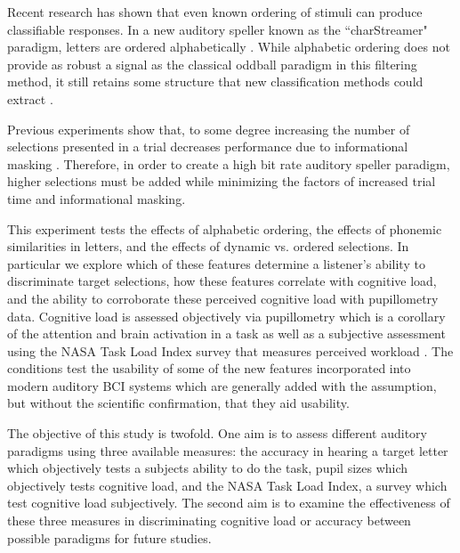 \documentclass[10pt]{article}
\begin{document}
Recent research has shown that even known ordering of stimuli can
produce classifiable responses.  In a new auditory speller known
as the “charStreamer" paradigm, letters are ordered
alphabetically \cite{Hohne2014}.  While alphabetic ordering does not
provide as robust a signal as the classical oddball paradigm in this
filtering method, it still retains some structure that
new classification methods could extract \cite{Hohne2014}.  

Previous experiments show that, to some degree increasing the number
of selections presented in a trial decreases performance due to
informational masking \cite{Maddox2012a}. Therefore, in order to
create a high bit rate auditory speller paradigm, higher selections
must be added while minimizing the factors of increased trial time
and informational masking. 



This experiment tests the effects of alphabetic ordering, the
effects of phonemic similarities in letters, and the effects
of dynamic vs. ordered selections.  In particular we explore
which of these features determine a listener's ability to
discriminate target selections, how these features correlate
with cognitive load, and the ability to corroborate these
perceived cognitive load with pupillometry data.  Cognitive load is
assessed objectively via pupillometry which is a corollary of
the attention and brain activation in a task as well as a
subjective assessment using the NASA Task Load Index survey
that measures perceived workload \cite{Zickler2013a}.  The
conditions test the usability of some of the new features
incorporated into modern auditory BCI systems which are
generally added with the assumption, but without the scientific
confirmation, that they aid usability.    

The objective of this study is twofold.  One aim is to assess
different auditory paradigms using three
available measures: the accuracy in hearing a target letter which objectively tests
a subjects ability to do the task,  pupil sizes which objectively
tests cognitive load, and the NASA Task Load Index, a survey which
test cognitive load subjectively.  The second aim is to examine the
effectiveness of these three measures in discriminating cognitive
load or accuracy
between possible paradigms for future studies.
\end{document}
